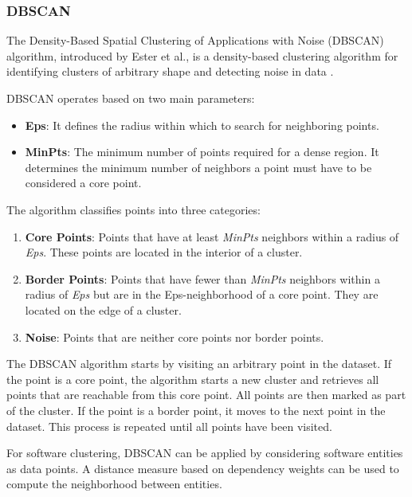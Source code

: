 \documentclass{ieeeaccess}
\begin{document}
\subsubsection{DBSCAN}
\label{subsubsec:dbscan}

The Density-Based Spatial Clustering of Applications with Noise (DBSCAN) algorithm, introduced by Ester et al., is a density-based clustering algorithm for identifying clusters of arbitrary shape and detecting noise in data \cite{dbscan}.

DBSCAN operates based on two main parameters:

\begin{itemize}
    \item \textbf{Eps}: It defines the radius within which to search for neighboring points.
    \item \textbf{MinPts}: The minimum number of points required for a dense region. It determines the minimum number of neighbors a point must have to be considered a core point.
\end{itemize}

The algorithm classifies points into three categories:

\begin{enumerate}
    \item \textbf{Core Points}: Points that have at least \textit{MinPts} neighbors within a radius of \textit{Eps}. These points are located in the interior of a cluster.
    \item \textbf{Border Points}: Points that have fewer than \textit{MinPts} neighbors within a radius of \textit{Eps} but are in the Eps-neighborhood of a core point. They are located on the edge of a cluster.
    \item \textbf{Noise}: Points that are neither core points nor border points.
\end{enumerate}

The DBSCAN algorithm starts by visiting an arbitrary point in the dataset. If the point is a core point, the algorithm starts a new cluster and retrieves all points that are reachable from this core point. All points are then marked as part of the cluster. If the point is a border point, it moves to the next point in the dataset. This process is repeated until all points have been visited.

For software clustering, DBSCAN can be applied by considering software entities as data points. A distance measure based on dependency weights can be used to compute the neighborhood between entities.
\end{document}
